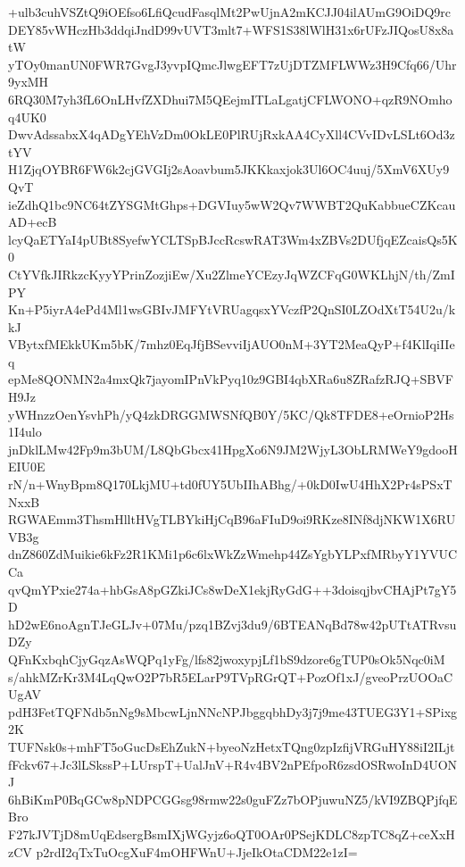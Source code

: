 +ulb3cuhVSZtQ9iOEfso6LfiQcudFasqlMt2PwUjnA2mKCJJ04ilAUmG9OiDQ9rc
DEY85vWHczHb3ddqiJndD99vUVT3mlt7+WFS1S38lWlH31x6rUFzJIQosU8x8atW
yTOy0manUN0FWR7GvgJ3yvpIQmcJlwgEFT7zUjDTZMFLWWz3H9Cfq66/Uhr9yxMH
6RQ30M7yh3fL6OnLHvfZXDhui7M5QEejmITLaLgatjCFLWONO+qzR9NOmhoq4UK0
DwvAdssabxX4qADgYEhVzDm0OkLE0PlRUjRxkAA4CyXll4CVvIDvLSLt6Od3ztYV
H1ZjqOYBR6FW6k2cjGVGIj2sAoavbum5JKKkaxjok3Ul6OC4uuj/5XmV6XUy9QvT
ieZdhQ1bc9NC64tZYSGMtGhps+DGVIuy5wW2Qv7WWBT2QuKabbueCZKcauAD+ecB
lcyQaETYaI4pUBt8SyefwYCLTSpBJccRcswRAT3Wm4xZBVs2DUfjqEZcaisQs5K0
CtYVfkJIRkzcKyyYPrinZozjiEw/Xu2ZlmeYCEzyJqWZCFqG0WKLhjN/th/ZmIPY
Kn+P5iyrA4ePd4Ml1wsGBIvJMFYtVRUagqsxYVczfP2QnSI0LZOdXtT54U2u/kkJ
VBytxfMEkkUKm5bK/7mhz0EqJfjBSevviIjAUO0nM+3YT2MeaQyP+f4KlIqiIIeq
epMe8QONMN2a4mxQk7jayomIPnVkPyq10z9GBI4qbXRa6u8ZRafzRJQ+SBVFH9Jz
yWHnzzOenYsvhPh/yQ4zkDRGGMWSNfQB0Y/5KC/Qk8TFDE8+eOrnioP2Hs1I4ulo
jnDklLMw42Fp9m3bUM/L8QbGbcx41HpgXo6N9JM2WjyL3ObLRMWeY9gdooHEIU0E
rN/n+WnyBpm8Q170LkjMU+td0fUY5UbIIhABhg/+0kD0IwU4HhX2Pr4sPSxTNxxB
RGWAEmm3ThsmHlltHVgTLBYkiHjCqB96aFIuD9oi9RKze8INf8djNKW1X6RUVB3g
dnZ860ZdMuikie6kFz2R1KMi1p6c6lxWkZzWmehp44ZsYgbYLPxfMRbyY1YVUCCa
qvQmYPxie274a+hbGsA8pGZkiJCs8wDeX1ekjRyGdG++3doisqjbvCHAjPt7gY5D
hD2wE6noAgnTJeGLJv+07Mu/pzq1BZvj3du9/6BTEANqBd78w42pUTtATRvsuDZy
QFnKxbqhCjyGqzAsWQPq1yFg/lfs82jwoxypjLf1bS9dzore6gTUP0sOk5Nqc0iM
s/ahkMZrKr3M4LqQwO2P7bR5ELarP9TVpRGrQT+PozOf1xJ/gveoPrzUOOaCUgAV
pdH3FetTQFNdb5nNg9sMbcwLjnNNcNPJbggqbhDy3j7j9me43TUEG3Y1+SPixg2K
TUFNsk0s+mhFT5oGucDsEhZukN+byeoNzHetxTQng0zpIzfijVRGuHY88iI2ILjt
fFckv67+Jc3lLSkssP+LUrspT+UalJnV+R4v4BV2nPEfpoR6zsdOSRwoInD4UONJ
6hBiKmP0BqGCw8pNDPCGGsg98rmw22s0guFZz7bOPjuwuNZ5/kVI9ZBQPjfqEBro
F27kJVTjD8mUqEdsergBsmIXjWGyjz6oQT0OAr0PSejKDLC8zpTC8qZ+ceXxHzCV
p2rdI2qTxTuOcgXuF4mOHFWnU+JjeIkOtaCDM22e1zI=
